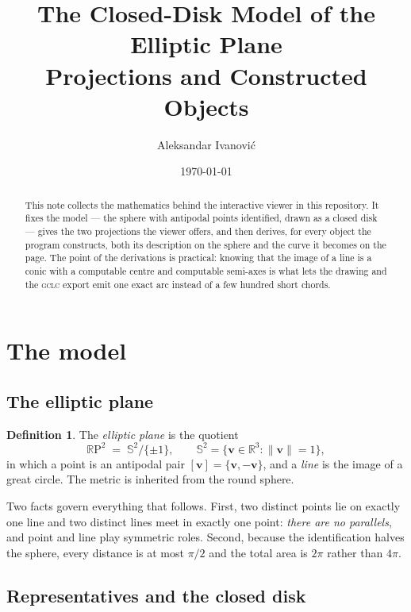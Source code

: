 \documentclass[11pt,a4paper]{article}
\title{\bfseries The Closed-Disk Model of the Elliptic Plane\\[2mm]
       \large Projections and Constructed Objects}
\author{Aleksandar Ivanović}
\date{\today}
\newcommand{\RP}{\mathbb{R}\mathrm{P}}
\newcommand{\R}{\mathbb{R}}
\newcommand{\Sph}{\mathbb{S}^2}
\newcommand{\vv}{\mathbf{v}}
\newcommand{\norm}[1]{\lVert #1 \rVert}
\theoremstyle{plain}
\theoremstyle{definition}
\newtheorem{definition}[proposition]{Definition}
\theoremstyle{remark}
\begin{document}
\maketitle

\begin{abstract}
\noindent
This note collects the mathematics behind the interactive viewer in this
repository. It fixes the model --- the sphere with antipodal points identified,
drawn as a closed disk --- gives the two projections the viewer offers, and then
derives, for every object the program constructs, both its description on the
sphere and the curve it becomes on the page. The point of the derivations is
practical: knowing that the image of a line is a conic with a computable centre
and computable semi-axes is what lets the drawing and the \textsc{gclc} export
emit one exact arc instead of a few hundred short chords.
\end{abstract}

\tableofcontents

\section{The model}

\subsection{The elliptic plane}

\begin{definition}
The \emph{elliptic plane} is the quotient
\[
  \RP^2 \;=\; \Sph/\{\pm 1\},
  \qquad
  \Sph=\{\vv\in\R^3 : \norm{\vv}=1\},
\]
in which a point is an antipodal pair $[\vv]=\{\vv,-\vv\}$, and a \emph{line} is
the image of a great circle. The metric is inherited from the round sphere.
\end{definition}

Two facts govern everything that follows. First, two distinct points lie on
exactly one line and two distinct lines meet in exactly one point: \emph{there
are no parallels}, and point and line play symmetric roles. Second, because the
identification halves the sphere, every distance is at most $\pi/2$ and the
total area is $2\pi$ rather than $4\pi$.

\subsection{Representatives and the closed disk}
\end{document}
